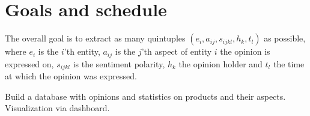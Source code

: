 \documentclass[10pt,a4paper]{article}
\begin{document}
	\section{Goals and schedule}
	The overall goal is to extract as many quintuples $(e_i, a_{ij}, s_{ijkl}, h_k, t_l)$ as possible, where $e_i$ is the $i$'th entity, $a_{ij}$ is the $j$'th aspect of entity $i$ the opinion is expressed on, $s_{ijkl}$ is the sentiment polarity, $h_k$ the opinion holder and $t_l$ the time at which the opinion was expressed.
	
	Build a database with opinions and statistics on products and their aspects.
	Visualization via dashboard.

	\newpage

	\nocite{DBLP:journals/corr/AndorAWSPGPC16}
	\nocite{Liu12sentimentanalysis}
	\nocite{Zhang2014}
	\nocite{pennington2014glove}
	\nocite{syntaxnet}
	\nocite{Ding:2008:HLA:1341531.1341561}
	\nocite{Hu:2004:MSC:1014052.1014073}

	
	
\end{document}
